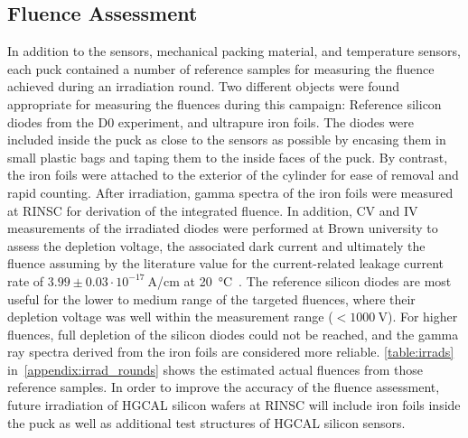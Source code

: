 \subsection{Fluence Assessment}
In addition to the sensors, mechanical packing material, and temperature sensors, each puck contained a number of reference samples for measuring the fluence achieved during an irradiation round. 
Two different objects were found appropriate for measuring the fluences during this campaign: Reference silicon diodes from the D0 experiment, and ultrapure iron foils. 
The diodes were included inside the puck as close to the sensors as possible by encasing them in small plastic bags and taping them to the inside faces of the puck. 
By contrast, the iron foils were attached to the exterior of the cylinder for ease of removal and rapid counting. 
After irradiation, gamma spectra of the iron foils were measured at RINSC for derivation of the integrated fluence.
In addition, CV and IV measurements of the irradiated diodes were performed at Brown university to assess the depletion voltage, the associated dark current and ultimately the fluence assuming by the literature value for the current-related leakage current rate of $3.99\pm 0.03\cdot 10^{-17}~$A/cm at \SI{20}{\celsius}~\cite{moll:SiDamages}.
The reference silicon diodes are most useful for the lower to medium range of the targeted fluences,  where their depletion voltage was well within the measurement range ($<\SI{1000}{\volt}$).
For higher fluences, full depletion of the silicon diodes could not be reached, and the gamma ray spectra derived from the iron foils are considered more reliable.
\ref{table:irrads} in~\ref{appendix:irrad_rounds} shows the estimated actual fluences from those reference samples.
In order to improve the accuracy of the fluence assessment, future irradiation of HGCAL silicon wafers at RINSC will include iron foils inside the puck as well as additional test structures of HGCAL silicon sensors.